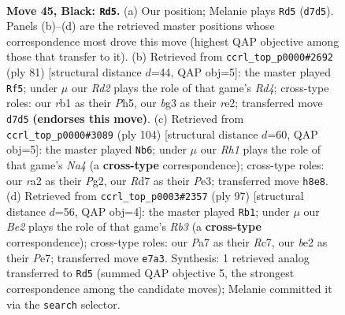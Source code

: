 \documentclass[11pt]{article}
\begin{document}
\clearpage

\begin{figure}[p]\centering
\begin{subfigure}{0.46\textwidth}\centering
\resizebox{\linewidth}{!}{%
\newchessgame
\chessboard[
  setfen={7r/p2rb1kp/7n/P7/8/1Pp3BP/R1P1B1PK/1R6 b - - 6 45},
  showmover=false,
  pgfstyle=straightmove, color=movearrow, markmove={d7-d5}
]}
\caption{}
\end{subfigure}\hfill
\begin{subfigure}{0.46\textwidth}\centering
\resizebox{\linewidth}{!}{%
\newchessgame
\chessboard[
  setfen={8/1p1b4/p5k1/3r2pp/1B6/P4P2/1P2RKPP/8 b - - 4 41},
  showmover=false,
  pgfstyle=straightmove, color=movearrow, markmove={d5-f5}
]}
\caption{}
\end{subfigure}
\\[4pt]
\begin{subfigure}{0.46\textwidth}\centering
\resizebox{\linewidth}{!}{%
\newchessgame
\chessboard[
  setfen={4rk2/5p2/p5p1/7p/NnbNp3/R3P2P/5PP1/6K1 w - - 0 53},
  showmover=false,
  pgfstyle=straightmove, color=movearrow, markmove={a4-b6}
]}
\caption{}
\end{subfigure}\hfill
\begin{subfigure}{0.46\textwidth}\centering
\resizebox{\linewidth}{!}{%
\newchessgame
\chessboard[
  setfen={3R4/2r1p3/1r3kp1/2n4p/p1P2P1P/5KP1/P1R1B3/8 b - - 20 49},
  showmover=false,
  pgfstyle=straightmove, color=movearrow, markmove={b6-b1}
]}
\caption{}
\end{subfigure}
\caption{\textbf{Move 45, Black: \texttt{Rd5}.} (a) Our position; Melanie plays \texttt{Rd5} (\texttt{d7d5}). Panels (b)--(d) are the retrieved master positions whose correspondence most drove this move (highest QAP objective among those that transfer to it). (b) Retrieved from \texttt{ccrl\_top\_p0000\#2692} (ply 81) [structural distance $d$=44, QAP obj=5]: the master played \texttt{Rf5}; under $\mu$ our \emph{Rd2} plays the role of that game's \emph{Rd4}; cross-type roles: our \emph{r}b1 as their \emph{P}h5, our \emph{b}g3 as their \emph{r}e2; transferred move \texttt{d7d5} \textbf{(endorses this move)}. (c) Retrieved from \texttt{ccrl\_top\_p0000\#3089} (ply 104) [structural distance $d$=60, QAP obj=5]: the master played \texttt{Nb6}; under $\mu$ our \emph{Rh1} plays the role of that game's \emph{Na4} (a \textbf{cross-type} correspondence); cross-type roles: our \emph{r}a2 as their \emph{P}g2, our \emph{R}d7 as their \emph{P}e3; transferred move \texttt{h8e8}. (d) Retrieved from \texttt{ccrl\_top\_p0003\#2357} (ply 97) [structural distance $d$=56, QAP obj=4]: the master played \texttt{Rb1}; under $\mu$ our \emph{Be2} plays the role of that game's \emph{Rb3} (a \textbf{cross-type} correspondence); cross-type roles: our \emph{P}a7 as their \emph{R}c7, our \emph{b}e2 as their \emph{P}e7; transferred move \texttt{e7a3}. Synthesis: 1 retrieved analog transferred to \texttt{Rd5} (summed QAP objective 5, the strongest correspondence among the candidate moves); Melanie committed it via the \texttt{search} selector.}
\label{fig:thought-m89}
\end{figure}
\end{document}
